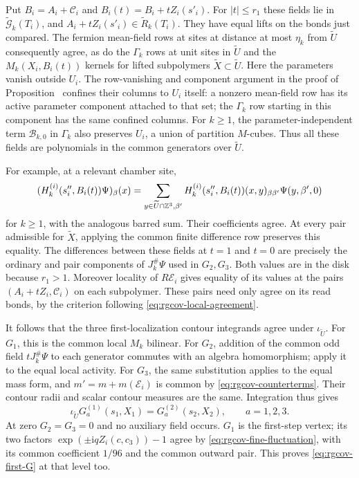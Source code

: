 Put $B_i=A_i+\mathscr C_i$ and
$B_i(t)=B_i+tZ_i(s'_i)$.
For $|t|\le r_1$ these fields lie in
$\widetilde{\mathcal G}_k(T_i)$, and
$A_i+tZ_i(s'_i)\in\widetilde R_k(T_i)$.
They have equal lifts on the bonds just compared.
The fermion mean-field rows at sites at distance
at most $\eta_k$ from $\widetilde U$ consequently agree,
as do the $\Gamma_k$ rows at unit sites in
$\widetilde U$ and the $M_k(X_i,B_i(t))$ kernels
for lifted subpolymers $\widetilde X\subset\widetilde U$.
Here the parameters vanish outside $U_i$.
The row-vanishing and component argument in the proof
of Proposition~ confines
their columns to $U_i$ itself: a nonzero mean-field
row has its active parameter component attached to
that set; the $\Gamma_k$ row starting in this component
has the same confined columns.
For $k\ge1$, the parameter-independent term $\mathcal B_{k,0}$
in $\Gamma_k$ also preserves $U_i$, a union of partition
$M$-cubes.
Thus all these fields are polynomials in the common
generators over $\widetilde U$.

For example, at a relevant chamber site,
\[
 (H_k^{(i)}(s_i'',B_i(t))\Psi)_\beta(x)
   =\sum_{y\in\widetilde U\cap\mathbb Z^3,\beta'}
         H_k^{(i)}(s_i'',B_i(t))(x,y)_{\beta\beta'}
                                      \Psi(y,\beta',0)
\]
for $k\ge1$, with the analogous barred sum.
Their coefficients agree.
At every pair admissible for $\widetilde X$, applying
the common finite difference row preserves this equality.
The differences between these fields at $t=1$ and $t=0$
are precisely the ordinary and pair components of
$J_k^\#\Psi$ used in $G_2,G_3$.
Both values are in the disk because $r_1>1$.
Moreover locality of $R\mathscr E_i$ gives equality
of its values at the pairs
$(A_i+tZ_i,\mathscr C_i)$ on each subpolymer.
These pairs need only agree on its read bonds,
by the criterion following
\eqref{eq:rgcov-local-agreement}.

It follows that the three first-localization contour
integrands agree under $\iota_{\widetilde U}$.
For $G_1$, this is the common local $M_k$ bilinear.
For $G_2$, addition of the common odd field $tJ_k^\#\Psi$
to each generator commutes with an algebra homomorphism;
apply it to the equal local activity.
For $G_3$, the same substitution applies to the equal
mass form, and $m'=m+m(\mathscr E_i)$ is common by
\eqref{eq:rgcov-counterterms}.
Their contour radii and scalar contour measures
are the same. Integration thus gives
\begin{equation}\label{eq:rgcov-first-G}
              \iota_{\widetilde U}G_a^{(1)}(s_1,X_1)
                                      =G_a^{(2)}(s_2,X_2),
                    \qquad a=1,2,3.
\end{equation}
At zero $G_2=G_3=0$ and no auxiliary field occurs.
$G_1$ is the first-step vertex; its two factors
$\exp(\pm\mathrm i qZ_i(c,c_3))-1$ agree by
\eqref{eq:rgcov-fine-fluctuation}, with its common
coefficient $1/96$ and the common outward pair.
This proves \eqref{eq:rgcov-first-G} at that level too.

